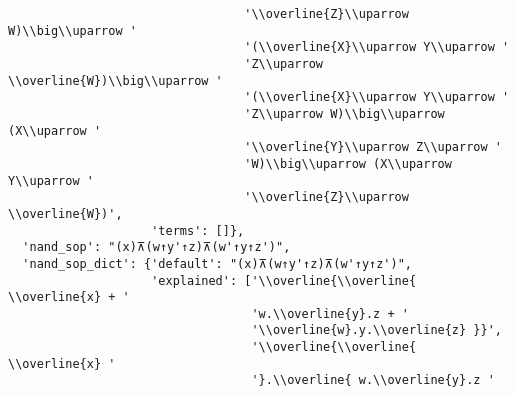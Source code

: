\begin{verbatim}
                                 '\\overline{Z}\\uparrow W)\\big\\uparrow '
                                 '(\\overline{X}\\uparrow Y\\uparrow '
                                 'Z\\uparrow \\overline{W})\\big\\uparrow '
                                 '(\\overline{X}\\uparrow Y\\uparrow '
                                 'Z\\uparrow W)\\big\\uparrow (X\\uparrow '
                                 '\\overline{Y}\\uparrow Z\\uparrow '
                                 'W)\\big\\uparrow (X\\uparrow Y\\uparrow '
                                 '\\overline{Z}\\uparrow \\overline{W})',
                    'terms': []},
  'nand_sop': "(x)⊼(w↑y'↑z)⊼(w'↑y↑z')",
  'nand_sop_dict': {'default': "(x)⊼(w↑y'↑z)⊼(w'↑y↑z')",
                    'explained': ['\\overline{\\overline{ \\overline{x} + '
                                  'w.\\overline{y}.z + '
                                  '\\overline{w}.y.\\overline{z} }}',
                                  '\\overline{\\overline{ \\overline{x} '
                                  '}.\\overline{ w.\\overline{y}.z '

\end{verbatim}

